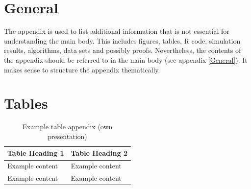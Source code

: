 \begin{appendices}


\section*{General}\label{General}

The appendix is used to list additional information that is not essential for understanding the main body. This includes figures, tables, \textsf{R} code, simulation results, algorithms, data sets and possibly proofs. Nevertheless, the contents of the appendix should be referred to in the main body (see appendix \ref{General}). It makes sense to structure the appendix thematically.

\section*{Tables}

\begin{table}[H]
    \centering
    \caption{Example table appendix (own presentation)}
    \begin{tabular}{|l|l|}
    \hline
        Table Heading 1 & Table Heading 2\\
        \hline
         Example content & Example content\\
         \hline
         Example content & Example content\\
         \hline
    \end{tabular}
    \label{tab:my_label1}
\end{table}

\end{appendices}